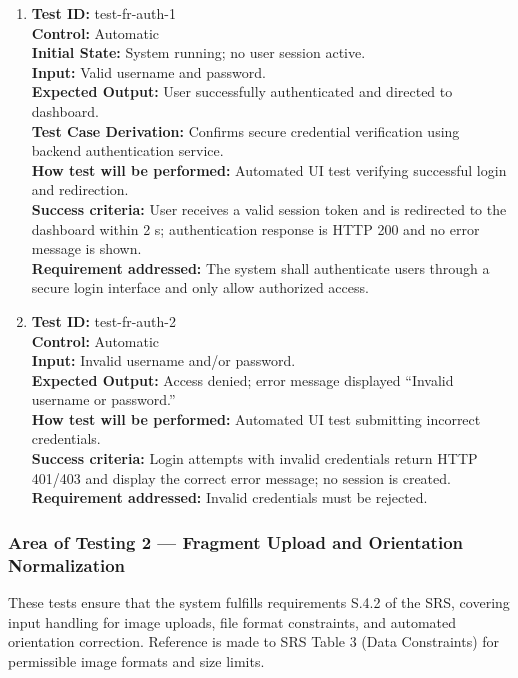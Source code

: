 \documentclass[12pt, titlepage]{article}
\begin{document}
\begin{enumerate}
\item 
\textbf{Test ID:} test-fr-auth-1\\
\textbf{Control:} Automatic\\
\textbf{Initial State:} System running; no user session active.\\
\textbf{Input:} Valid username and password.\\
\textbf{Expected Output:} User successfully authenticated and directed to dashboard.\\
\textbf{Test Case Derivation:} Confirms secure credential verification using backend authentication service.\\
\textbf{How test will be performed:} Automated UI test verifying successful login and redirection.\\
\textbf{Success criteria:} User receives a valid session token and is redirected to the dashboard within 2 s; authentication response is HTTP 200 and no error message is shown.\\
\textbf{Requirement addressed:} The system shall authenticate users through a secure login interface and only allow authorized access.\\

\item 
\textbf{Test ID:} test-fr-auth-2\\
\textbf{Control:} Automatic\\
\textbf{Input:} Invalid username and/or password.\\
\textbf{Expected Output:} Access denied; error message displayed ``Invalid username or password.''\\
\textbf{How test will be performed:} Automated UI test submitting incorrect credentials.\\
\textbf{Success criteria:} Login attempts with invalid credentials return HTTP 401/403 and display the correct error message; no session is created.\\
\textbf{Requirement addressed:} Invalid credentials must be rejected.\\
\end{enumerate}

\subsubsection{Area of Testing 2 — Fragment Upload and Orientation Normalization}

These tests ensure that the system fulfills requirements S.4.2 of the SRS, covering input handling for image uploads, file format constraints, and automated orientation correction. Reference is made to SRS Table 3 (Data Constraints) for permissible image formats and size limits.
\end{document}
